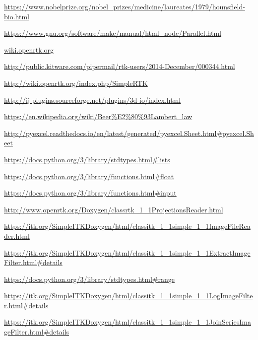 \documentclass[a4paper,12pt, doubleside]{report}
\begin{document}
\begin{thebibliography}{1}
        \url{https://www.nobelprize.org/nobel_prizes/medicine/laureates/1979/hounsfield-bio.html}
    
        \url{https://www.gnu.org/software/make/manual/html_node/Parallel.html}
        
        \url{wiki.openrtk.org}
        
        \url{http://public.kitware.com/pipermail/rtk-users/2014-December/000344.html}
        
        \url{http://wiki.openrtk.org/index.php/SimpleRTK}
        
        \url{http://ij-plugins.sourceforge.net/plugins/3d-io/index.html}
    
        \url{https://en.wikipedia.org/wiki/Beer%E2%80%93Lambert_law}
        
        \url{http://pyexcel.readthedocs.io/en/latest/generated/pyexcel.Sheet.html#pyexcel.Sheet}
        
        \url{https://docs.python.org/3/library/stdtypes.html#lists}
        
        \url{https://docs.python.org/3/library/functions.html#float}
        
        \url{https://docs.python.org/3/library/functions.html#input}
        
        \url{http://www.openrtk.org/Doxygen/classrtk_1_1ProjectionsReader.html}
    
        \url{https://itk.org/SimpleITKDoxygen/html/classitk_1_1simple_1_1ImageFileReader.html}
    
        \url{https://itk.org/SimpleITKDoxygen/html/classitk_1_1simple_1_1ExtractImageFilter.html#details}
    
        \url{https://docs.python.org/3/library/stdtypes.html#range}
        
        \url{https://itk.org/SimpleITKDoxygen/html/classitk_1_1simple_1_1LogImageFilter.html#details}
        
        \url{https://itk.org/SimpleITKDoxygen/html/classitk_1_1simple_1_1JoinSeriesImageFilter.html#details}
        

\end{thebibliography}
\end{document}
